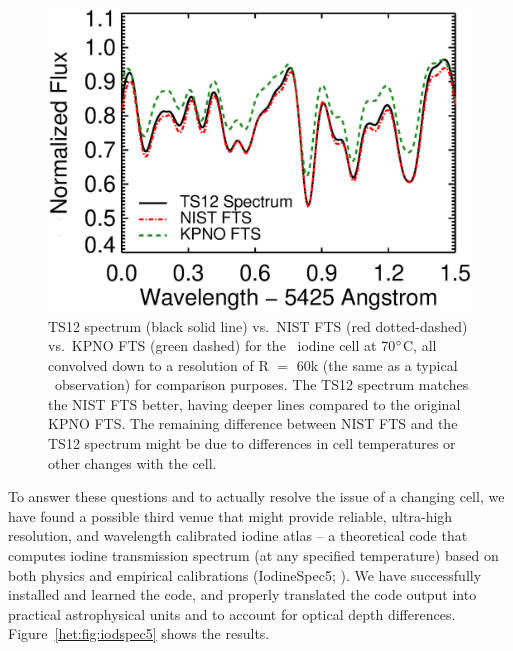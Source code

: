 \begin{figure}
\centering
\includegraphics[scale=0.5]{het/het70_comp.eps}
\caption{TS12 spectrum (black solid line) vs.\ NIST FTS (red
  dotted-dashed) vs.\ KPNO FTS (green dashed) for the \het\ iodine
  cell at 70$^{\circ}$C, all convolved down to a resolution of R $=$
  60k (the same as a typical \het\ observation) for comparison
  purposes. The TS12 spectrum matches the NIST FTS better, having
  deeper lines compared to the original KPNO FTS. The remaining
  difference between NIST FTS and the TS12 spectrum might be due to
  differences in cell temperatures or other changes with the cell. 
\label{het:fig:hetts12}}
\end{figure}



To answer these questions and to actually resolve the issue of a
changing cell, we have found a possible third venue that might provide
reliable, ultra-high resolution, and wavelength calibrated iodine
atlas -- a theoretical code that computes iodine transmission spectrum
(at any specified temperature) based on both physics and empirical
calibrations (IodineSpec5; \citealt{iodinespec5}). We have
successfully installed and learned the code, and properly translated
the code output into practical astrophysical units and to account for
optical depth differences. Figure~\ref{het:fig:iodspec5} shows the results.





